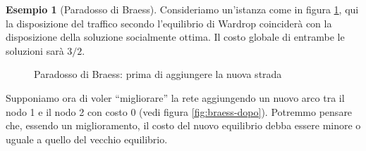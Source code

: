 \documentclass[a4paper]{article}
\theoremstyle{plain}
\theoremstyle{definition}
\newtheorem{myes}[myteo]{Esempio}
\theoremstyle{remark}
\begin{document}
\begin{myes}[Paradosso di Braess{\cite[pag. 263]{braess1968}}]
\label{es:braess}
  Consideriamo un'istanza come in figura \ref{fig:braess-prima}, qui
  la disposizione del traffico secondo l'equilibrio di Wardrop
  coinciderà con la disposizione della soluzione socialmente
  ottima. Il costo globale di entrambe le soluzioni sarà $3/2$.
  \begin{figure}[ht]
    \centering
    \caption{Paradosso di Braess: prima di aggiungere la nuova strada}
    \label{fig:braess-prima}
  \end{figure}

  Supponiamo ora di voler ``migliorare'' la rete aggiungendo un nuovo
  arco tra il nodo 1 e il nodo 2 con costo $0$ (vedi figura
  \ref{fig:braess-dopo}). Potremmo pensare che, essendo un
  miglioramento, il costo del nuovo equilibrio debba essere minore o
  uguale a quello del vecchio equilibrio.


\end{myes}
\end{document}
